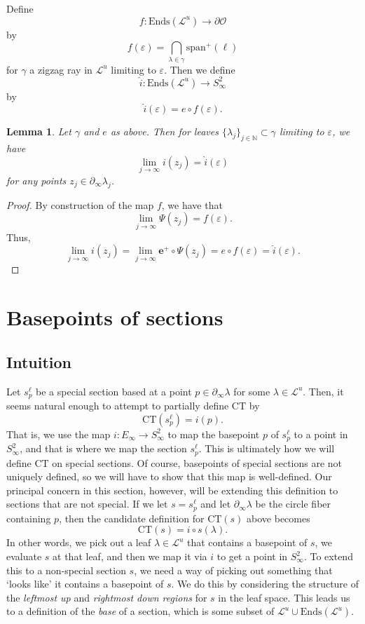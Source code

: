 \documentclass[11pt]{amsart}
\renewcommand{\l}{\lambda}
\newcommand{\mc}{\mathcal}
\newcommand{\wh}{\widehat}
\newcommand{\N}{\mathbb{N}}
\newcommand{\orb}{\mathcal{O}}
\newcommand{\spn}{\mathrm{span}}
\newcommand{\eplus}{\mathbf{e}^+}
\newcommand{\Ends}{\mathrm{Ends}}
\newcommand{\ct}{\mathrm{CT}}
\newcommand{\vep}{\varepsilon}
\numberwithin{equation}{section}
\newtheorem{lemma}[equation]{Lemma}
\theoremstyle{definition}
\begin{document}
\begin{definition}\label{def:i_hat}
	Define
	\[
	f\colon\Ends(\mc L^u)\to \partial\orb
	\]
	by
	\[
	f(\vep)=\bigcap_{\l\in\gamma}\spn^+(\ell)
	\]
	for $\gamma$ a zigzag ray in $\mc L^u$ limiting to $\vep$. Then we define 
	\[
	\wh i\colon\Ends(\mc L^u)\to S^2_\infty
	\]
	by
	\[
	\wh i(\vep)=e\circ f(\vep).
	\]
\end{definition}


\begin{lemma}\label{lem:i_hat_cts}
	Let $\gamma$ and $e$ as above. Then for leaves $\{\l_j\}_{j\in\N}\subset\gamma$ limiting to $\vep$, we have
	\[
	\lim_{j\to\infty}i(z_j)=\wh i(\vep)
	\] 
	for any points $z_j\in\partial_\infty\l_j$.
\end{lemma}

\begin{proof}

	By construction of the map $f$, we have that 
	\[
	\lim_{j\to\infty}\Psi (z_j)=f(\vep).
	\]
	Thus,
	\[
	\lim_{j\to\infty}i (z_j)=\lim_{j\to\infty}\eplus\circ\Psi (z_j)=e\circ f(\vep)=\wh i(\vep).
	\]
\end{proof}

\section{Basepoints of sections}\label{sec:basepoint}

\subsection{Intuition}



Let $s^\ell_p$ be a special section based at a point $p\in\partial_\infty\l$ for some $\l\in\mc L^u$. Then, it seems natural enough to attempt to partially define $\ct$ by 
\[
\ct(s^\ell_p)=i(p).
\]
That is, we use the map $i\colon E_\infty\to S^2_\infty$ to map the basepoint $p$ of $s^\ell_p$ to a point in $S^2_\infty$, and that is where we map the section $s^\ell_p$. This is ultimately how we will define $\ct$ on special sections. Of course, basepoints of special sections are not uniquely defined, so we will have to show that this map is well-defined. Our principal concern in this section, however, will be extending this definition to sections that are not special. If we let $s=s^\ell_p$ and let $\partial_\infty\l$ be the circle fiber containing $p$, then the candidate definition for $\ct(s)$ above becomes
\[
\ct(s)=i\circ s(\l).
\]
In other words, we pick out a leaf $\l\in \mc L^u$ that contains a basepoint of $s$, we evaluate $s$ at that leaf, and then we map it via $i$ to get a point in $S^2_\infty$. To extend this to a non-special section $s$, we need a way of picking out something that `looks like' it contains a basepoint of $s$. We do this by considering the structure of the \emph{leftmost up} and \emph{rightmost down regions} for $s$ in the leaf space. This leads us to a definition of the \emph{base} of a section, which is some subset of $\mc L^u\cup\Ends(\mc L^u)$.
\end{document}
